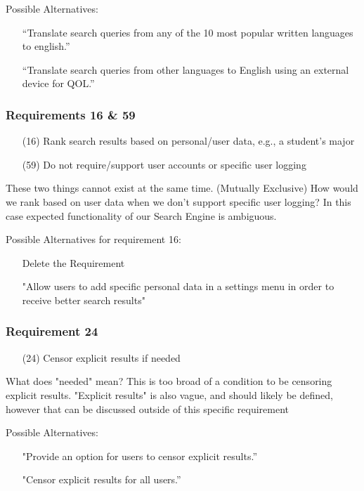 \medskip

Possible Alternatives:
\begin{itemize}
  \item[] “Translate search queries from any of the 10 most popular written languages to english.”
  \item[] “Translate search queries from other languages to English using an external device for QOL.”
\end{itemize}


\subsubsection*{Requirements 16 \& 59}
\begin{itemize}
  \item[(16)] Rank search results based on personal/user data, e.g., a student's major
  \item[(59)] Do not require/support user accounts or specific user logging
\end{itemize}

These two things cannot exist at the same time. (Mutually Exclusive)
How would we rank based on user data when we don't support specific user logging? In this case expected functionality of our Search Engine is ambiguous.

\medskip

Possible Alternatives for requirement 16:
\begin{itemize}
  \item[] Delete the Requirement
  \item[] "Allow users to add specific personal data in a settings menu in order to receive better search results"
\end{itemize}

\subsubsection*{Requirement 24}
\begin{itemize}
  \item[(24)] Censor explicit results if needed
\end{itemize}

What does "needed" mean? This is too broad of a condition to be censoring explicit results. "Explicit results" is also vague, and should likely be defined, however that can be discussed outside of this specific requirement

\medskip

Possible Alternatives:
\begin{itemize}
  \item[] "Provide an option for users to censor explicit results.”
  \item[] "Censor explicit results for all users.”
\end{itemize}

